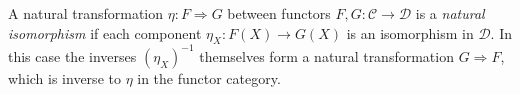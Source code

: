 
A natural transformation $\eta:F\Rightarrow G$ between functors $F,G:\mathcal C\to\mathcal D$ is a \emph{natural isomorphism} if each component $\eta_X:F(X)\to G(X)$ is an isomorphism in $\mathcal D$. In this case the inverses $(\eta_X)^{-1}$ themselves form a natural transformation $G\Rightarrow F$, which is inverse to $\eta$ in the functor category.
